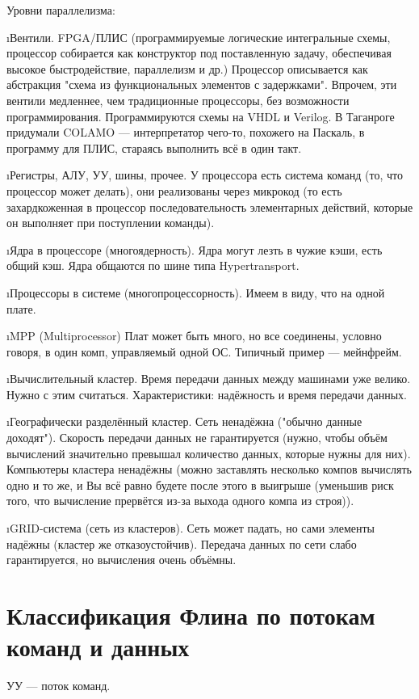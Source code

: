  Уровни параллелизма:
 \begin{enumerate}
  \i Вентили. FPGA/ПЛИС (программируемые логические интегральные схемы, процессор собирается как конструктор под поставленную задачу, обеспечивая высокое быстродействие, параллелизм и др.) Процессор описывается как абстракция "схема из функциональных элементов с задержками". Впрочем, эти вентили медленнее, чем традиционные процессоры, без возможности программирования. Программируются схемы на VHDL и Verilog. В Таганроге придумали COLAMO — интерпретатор чего-то, похожего на Паскаль, в программу для ПЛИС, стараясь выполнить всё в один такт.
 
  \i Регистры, АЛУ, УУ, шины, прочее.
  У процессора есть система команд (то, что процессор может делать), они реализованы через микрокод (то есть захардкоженная в процессор последовательность элементарных действий, которые он выполняет при поступлении команды).
 
  \i Ядра в процессоре (многоядерность).
  Ядра могут лезть в чужие кэши, есть общий кэш. Ядра общаются по шине типа Hypertransport. 
 
  \i Процессоры в системе (многопроцессорность).
  Имеем в виду, что на одной плате.
 
  \i MPP (Multiprocessor)
  Плат может быть много, но все соединены, условно говоря, в один комп, управляемый одной ОС. Типичный пример --- мейнфрейм.
 
  \i Вычислительный кластер. 
  Время передачи данных между машинами уже велико. Нужно с этим считаться. Характеристики: надёжность и время передачи данных.
 
  \i Географически разделённый кластер.
  Сеть ненадёжна ("обычно данные доходят"). Скорость передачи данных не гарантируется (нужно, чтобы объём вычислений значительно превышал количество данных, которые нужны для них). Компьютеры кластера ненадёжны (можно заставлять несколько компов вычислять одно и то же, и Вы всё равно будете после этого в выигрыше (уменьшив риск того, что вычисление прервётся из-за выхода одного компа из строя)).
 
  \i GRID-система (сеть из кластеров).
  Сеть может падать, но сами элементы надёжны (кластер же отказоустойчив). Передача данных по сети слабо гарантируется, но вычисления очень объёмны.
 \end{enumerate}
  
 \section{ Классификация Флина по потокам команд и данных}
 УУ --- поток команд.
 
